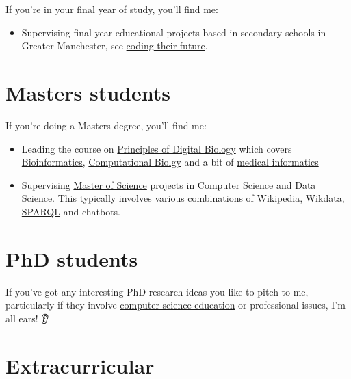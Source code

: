 \documentclass[
  12pt,
]{book}
\providecommand{\tightlist}{%
  \setlength{\itemsep}{0pt}\setlength{\parskip}{0pt}}
\begin{document}
If you're in your final year of study, you'll find me:

\begin{itemize}
\tightlist
\item
  Supervising final year educational projects based in secondary schools in Greater Manchester, see \href{https://personalpages.manchester.ac.uk/staff/duncan.hull/coding-their-future}{coding their future}. \citep{computinged} 👩‍💻👨‍💻
\end{itemize}

\hypertarget{masters}{%
\section{Masters students}\label{masters}}

If you're doing a Masters degree, you'll find me:

\begin{itemize}
\tightlist
\item
  Leading the course on \href{http://studentnet.cs.manchester.ac.uk/pgt/COMP60532/syllabus/}{Principles of Digital Biology} which covers \href{https://en.wikipedia.org/wiki/Bioinformatics}{Bioinformatics}, \href{https://en.wikipedia.org/wiki/Computational_biology}{Computational Biolgy} and a bit of \href{https://en.wikipedia.org/wiki/Health_informatics}{medical informatics} 🧬
\item
  Supervising \href{https://www.cs.manchester.ac.uk/study/masters/}{Master of Science} projects in Computer Science and Data Science. \citep{r4ds} This typically involves various combinations of Wikipedia, Wikdata, \href{https://en.wikipedia.org/wiki/SPARQL}{SPARQL} \citep{ducharme} and chatbots. 🤖 \citep{myca}
\end{itemize}

\hypertarget{phds}{%
\section{PhD students}\label{phds}}

If you've got any interesting PhD research ideas you like to pitch to me, particularly if they involve \href{https://sigcse.cs.manchester.ac.uk}{computer science education} or professional issues, I'm all ears! 👂

\hypertarget{extracurricular}{%
\section{Extracurricular}\label{extracurricular}}
\end{document}
